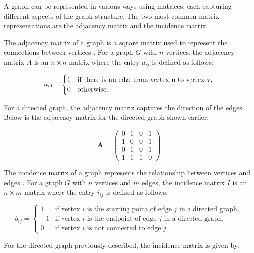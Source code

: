 A graph can be represented in various ways using matrices, each capturing different aspects of the graph structure. The two most common matrix representations are the adjacency matrix and the incidence matrix.

The adjacency matrix of a graph is a square matrix used to represent the connections between vertices \cite{wilson_1972}. For a graph $G$ with $n$ vertices, the adjacency matrix $A$ is an $n \times n$ matrix where the entry $a_{ij}$ is defined as follows:

\begin{equation}
 a_{ij} = 
\begin{cases}
1 & \text{if there is an edge from vertex } $u$ \text{ to vertex } $v$, \\
0 & \text{otherwise}.
\end{cases}
    \label{eq:adjacency_matrix_definition}
\end{equation}


For a directed graph, the adjacency matrix captures the direction of the edges. Below is the adjacency matrix for the directed graph shown earlier:

\[
\mathbf{A} = \begin{pmatrix}
0 & 1 & 0 & 1 \\
1 & 0 & 0 & 1 \\
0 & 1 & 0 & 1 \\
1 & 1 & 1 & 0
\end{pmatrix}
\]


The incidence matrix of a graph represents the relationship between vertices and edges \cite{wilson_1972}. For a graph $G$ with $n$ vertices and $m$ edges, the incidence matrix $I$ is an $n \times m$ matrix where the entry $i_{ij}$ is defined as follows:

\begin{equation}
 b_{ij} =
\begin{cases}
1 & \text{if vertex } i \text{ is the starting point of edge } j \text{ in a directed graph}, \\
-1 & \text{if vertex } i \text{ is the endpoint of edge } j \text{ in a directed graph}, \\
0 & \text{if vertex } i \text{ is not connected to edge } j.
\end{cases}  
    \label{eq:incidence_matrix_definition}
\end{equation}


For the directed graph previously described, the incidence matrix is given by:

